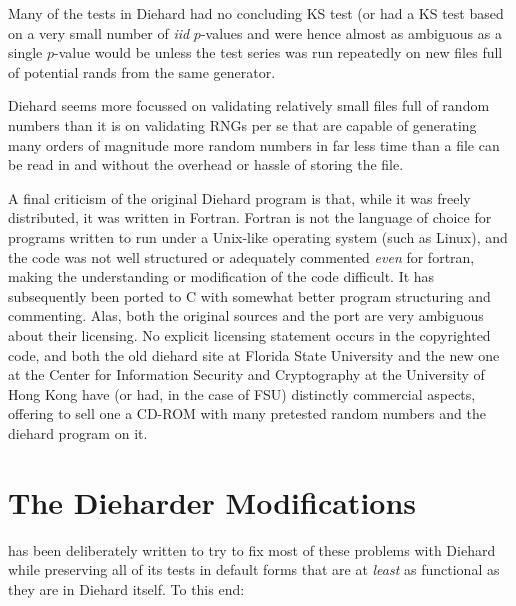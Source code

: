 \documentclass{book}
\begin{document}
Many of the tests in Diehard had no concluding KS test (or had a KS test
based on a very small number of {\em iid} $p$-values and were hence
almost as ambiguous as a single $p$-value would be unless the test
series was run repeatedly on new files full of potential rands from the
same generator.  

Diehard seems more focussed on validating relatively small files full of
random numbers than it is on validating RNGs per se that are capable of
generating many orders of magnitude more random numbers in far less time
than a file can be read in and without the overhead or hassle of storing
the file.

A final criticism of the original Diehard program is that, while it was
freely distributed, it was written in Fortran.  Fortran is not the
language of choice for programs written to run under a Unix-like
operating system (such as Linux), and the code was not well structured
or adequately commented {\em even} for fortran, making the understanding
or modification of the code difficult.  It has subsequently been ported
to C\cite{hkproj} with somewhat better program structuring and
commenting.  Alas, both the original sources and the port are very
ambiguous about their licensing.  No explicit licensing statement occurs
in the copyrighted code, and both the old diehard site at Florida State
University and the new one at the Center for Information Security and
Cryptography at the University of Hong Kong have (or had, in the case of
FSU) distinctly commercial aspects, offering to sell one a CD-ROM with
many pretested random numbers and the diehard program on it.

\section{The Dieharder Modifications}

\die has been deliberately written to try to fix most of these problems
with Diehard while preserving all of its tests in default forms that are
at {\em least} as functional as they are in Diehard itself.  To this
end:
\end{document}
